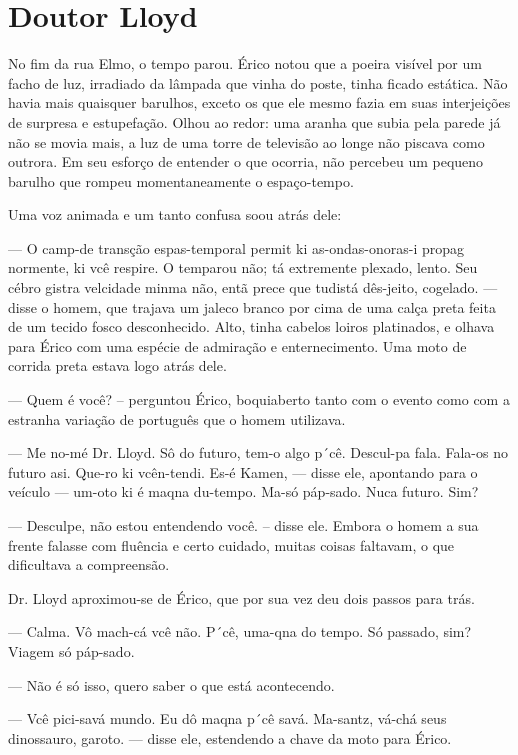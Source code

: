 \chapter{Doutor Lloyd}

No fim da rua Elmo, o tempo parou. Érico notou que a poeira visível por
um facho de luz, irradiado da lâmpada que vinha do poste, tinha ficado
estática. Não havia mais quaisquer barulhos, exceto os que ele mesmo
fazia em suas interjeições de surpresa e estupefação. Olhou ao redor:
uma aranha que subia pela parede já não se movia mais, a luz de uma
torre de televisão ao longe não piscava como outrora. Em seu esforço de
entender o que ocorria, não percebeu um pequeno barulho que rompeu
momentaneamente o espaço-tempo.

Uma voz animada e um tanto confusa soou atrás dele:

--- O camp-de transção espas-temporal permit ki as-ondas-onoras-i propag
normente, ki vcê respire. O temparou não; tá extremente plexado, lento.
Seu cébro gistra velcidade minma não, entã prece que tudistá dês-jeito,
cogelado. --- disse o homem, que trajava um jaleco branco por cima de uma
calça preta feita de um tecido fosco desconhecido. Alto, tinha cabelos
loiros platinados, e olhava para Érico com uma espécie de admiração e
enternecimento. Uma moto de corrida preta estava logo atrás dele.

--- Quem é você? – perguntou Érico, boquiaberto tanto com o evento como
com a estranha variação de português que o homem utilizava.

--- Me no-mé Dr. Lloyd. Sô do futuro, tem-o algo p´cê. Descul-pa fala.
Fala-os no futuro asi. Que-ro ki vcên-tendi. Es-é Kamen, --- disse ele,
apontando para o veículo --- um-oto ki é maqna du-tempo. Ma-só páp-sado.
Nuca futuro. Sim?

--- Desculpe, não estou entendendo você. – disse ele. Embora o homem a sua
frente falasse com fluência e certo cuidado, muitas coisas faltavam, o
que dificultava a compreensão.

Dr. Lloyd aproximou-se de Érico, que por sua vez deu dois passos para
trás.

--- Calma. Vô mach-cá vcê não. P´cê, uma-qna do tempo. Só passado, sim?
Viagem só páp-sado.

--- Não é só isso, quero saber o que está acontecendo.

--- Vcê pici-savá mundo. Eu dô maqna p´cê savá. Ma-santz, vá-chá seus
dinossauro, garoto. --- disse ele, estendendo a chave da moto para Érico.

